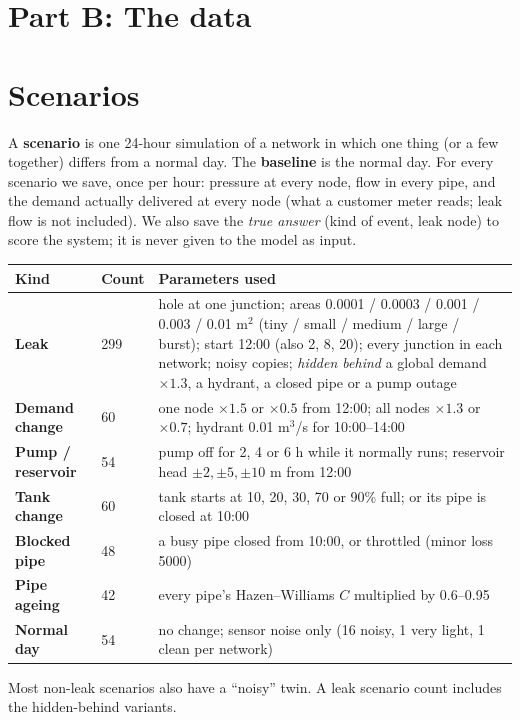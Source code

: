 \documentclass[11pt,a4paper]{article}
\begin{document}
\section*{Part B: The data}
\section{Scenarios}
A \textbf{scenario} is one 24-hour simulation of a network in which one thing (or a few together) differs from a normal day. The \textbf{baseline} is the normal day. For every scenario we save, once per hour: pressure at every node, flow in every pipe, and the demand actually delivered at every node (what a customer meter reads; leak flow is not included). We also save the \emph{true answer} (kind of event, leak node) to score the system; it is never given to the model as input.
\begin{center}\small\begin{tabularx}{\linewidth}{@{}>{\bfseries}p{2.1cm}p{0.8cm}Y@{}}\toprule
Kind & Count & Parameters used \\\midrule
Leak & 299 & hole at one junction; areas 0.0001 / 0.0003 / 0.001 / 0.003 / 0.01 m$^2$ (tiny / small / medium / large / burst); start 12:00 (also 2, 8, 20); every junction in each network; noisy copies; \emph{hidden behind} a global demand $\times1.3$, a hydrant, a closed pipe or a pump outage \\
Demand change & 60 & one node $\times1.5$ or $\times0.5$ from 12:00; all nodes $\times1.3$ or $\times0.7$; hydrant 0.01 m$^3$/s for 10:00--14:00 \\
Pump / reservoir & 54 & pump off for 2, 4 or 6 h while it normally runs; reservoir head $\pm2,\pm5,\pm10$ m from 12:00 \\
Tank change & 60 & tank starts at 10, 20, 30, 70 or 90\% full; or its pipe is closed at 10:00 \\
Blocked pipe & 48 & a busy pipe closed from 10:00, or throttled (minor loss 5000) \\
Pipe ageing & 42 & every pipe's Hazen--Williams $C$ multiplied by 0.6--0.95 \\
Normal day & 54 & no change; sensor noise only (16 noisy, 1 very light, 1 clean per network) \\\bottomrule\end{tabularx}\end{center}
Most non-leak scenarios also have a ``noisy'' twin. A leak scenario count includes the hidden-behind variants.
\end{document}
